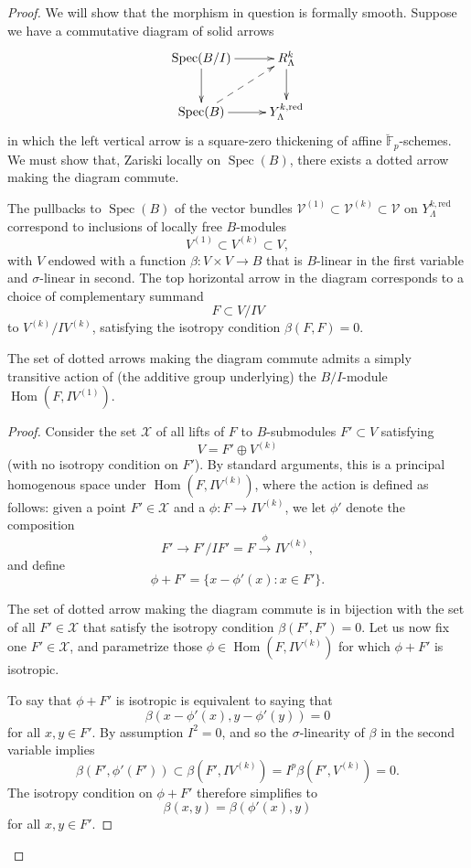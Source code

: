 \documentclass[11pt]{alggeom}
\newcommand{\map}[1]{\xrightarrow{#1}}
\newcommand{\red}{\mathrm{red}}
\newcommand{\F}{\mathbb F}
\DeclareMathOperator{\Hom}{Hom}
\DeclareMathOperator{\Spec}{Spec}
\begin{document}
\begin{proof}
We will show that the morphism in question is formally smooth.  Suppose we have a commutative diagram of solid arrows
\[
\xymatrix{
{  \Spec(B/I) }  \ar[r]   \ar[d]   & {  R_\Lambda^k  }  \ar[d]   \\
{ \Spec( B ) }  \ar[r] \ar@{-->}[ru]   &  {  Y^{k,\red}_\Lambda  } 
}
\]
in which the left vertical arrow is a square-zero thickening of affine $\breve{\F}_p$-schemes.  We must show that, Zariski locally on $\Spec( B)$, there exists a dotted arrow making the diagram commute.  


The  pullbacks to $\Spec( B )$ of the vector bundles 
$
\mathscr{V}^{(1)} \subset \mathscr{V}^{(k)} \subset \mathscr{V}
$ 
on $Y_\Lambda^{k,\red}$ correspond to inclusions of locally  free $B$-modules
\[
V^{(1)} \subset V^{(k)} \subset V,
\] 
with $V$ endowed with a function 
$
\beta : V \times V \to B
$
that is $B$-linear in the first variable and $\sigma$-linear in second.
The top horizontal arrow in the diagram corresponds to a choice of complementary summand 
\[
F \subset V/IV
\]
  to $V^{(k)}/ I V^{(k)}$,  satisfying the isotropy condition $\beta( F , F) =0$.  


\begin{lemma}
The set of dotted arrows making the diagram commute admits a simply transitive action of  (the additive group underlying) the $B/I$-module $\Hom(F, I V^{(1)})$.
\end{lemma}

\begin{proof}
Consider  the set  $\mathcal{X}$ of all lifts of $F$ to $B$-submodules $F' \subset V$ satisfying 
\[
V = F' \oplus V^{(k)}  
\]
(with no isotropy condition on $F'$). By standard arguments, this
is a principal homogenous space under  $\Hom(F, I V^{(k)}  )$, where 
the action is defined as follows: given a point $F' \in \mathcal{X}$ and a $\phi : F \to I V^{(k)}$, we let $\phi'$ denote the composition
\[
F' \to F'/IF' = F \map{\phi} I V^{(k)},
\]
and define
\[
\phi+ F' = \{ x-\phi'(x) : x\in F' \}.
\]

The set of dotted arrow making the diagram commute is in bijection with the set of all $F' \in \mathcal{X}$ that satisfy the isotropy condition $\beta(F',F')=0$.
Let us now fix one $F' \in \mathcal{X}$, and parametrize those $\phi \in \Hom(F, I V^{(k)}  )$ for which $\phi+F'$ is isotropic.

To say that $\phi + F'$ is isotropic is equivalent to saying that 
\[
\beta(  x -\phi'(x)  ,  y-\phi'(y) )=0
\]
 for all $x,y\in F'$.   By assumption $I^2= 0$, and so the $\sigma$-linearity of $\beta$ in the second variable implies 
\[
\beta( F' , \phi'(F')) \subset \beta(F', IV^{(k)}) = I^p \beta(F',  V^{(k)}) =0.
\]
The isotropy condition on $\phi+F'$ therefore simplifies to 
\begin{equation}\label{isotropy lift}
\beta(x,y) = \beta( \phi'(x) , y) 
\end{equation}
for all $x,y\in F'$.


\end{proof}
\end{proof}
\end{document}
